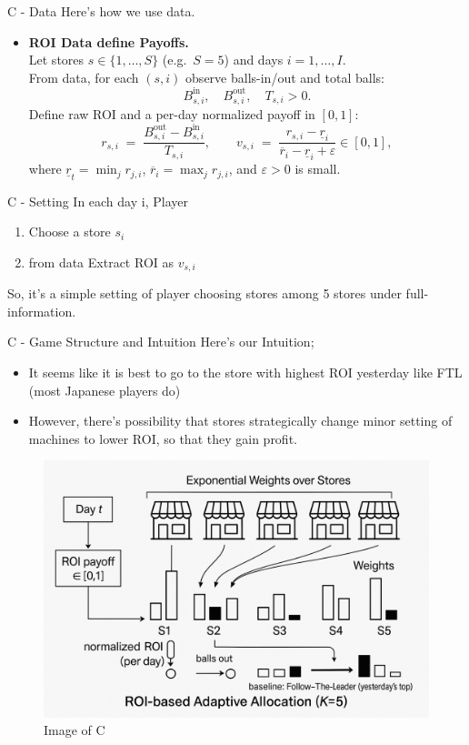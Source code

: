 \documentclass{beamer}
\begin{document}
\begin{frame}{C - Data}
    Here's how we use data.\\
    \begin{itemize}
        \item \textbf{ROI Data define Payoffs.}\\
    Let stores $s\in\{1,\dots,S\}$ (e.g.\ $S=5$) and days $i=1,\dots,I$.\\
    From data, for each $(s,i)$ observe balls-in/out and total balls:
    \[
    B^{\text{in}}_{s,i},\quad B^{\text{out}}_{s,i},\quad T_{s,i}>0.
    \]
    Define raw ROI and a per-day normalized payoff in $[0,1]$:
    \[
    r_{s,i}\;=\;\frac{B^{\text{out}}_{s,i}-B^{\text{in}}_{s,i}}{ T_{s,i}},\qquad
    v_{s,i}\;=\;\frac{r_{s,i}-\underline r_i}{\overline r_i-\underline r_i+\varepsilon}\in[0,1],
    \]
    where $\underline r_t=\min_{j} r_{j,i}$, $\overline r_i=\max_{j} r_{j,i}$, and $\varepsilon>0$ is small.
    \end{itemize}
\end{frame}

\begin{frame}{C - Setting}
In each day i, Player
\begin{enumerate}
  \item Choose a store $s_i$ 
  \item from data Extract ROI as $v_{s,i}$
\end{enumerate}
\vspace{1em}
So, it's a simple setting of player choosing stores among 5 stores under full-information.

\end{frame}

\begin{frame}{C - Game Structure and Intuition}
Here's our Intuition;
\begin{itemize}
    \item It seems like it is best to go to the store with highest ROI yesterday like FTL (most Japanese players do)
    \item However, there's possibility that stores strategically change minor setting of machines to lower ROI, so that they gain profit. 
\end{itemize}
\begin{figure}
    \centering
    \includegraphics[width=0.4\linewidth]{332Project2/figures/Image_C.png}
    \caption{Image of C}
    \label{fig:placeholder}
\end{figure}

\end{frame}
\end{document}
